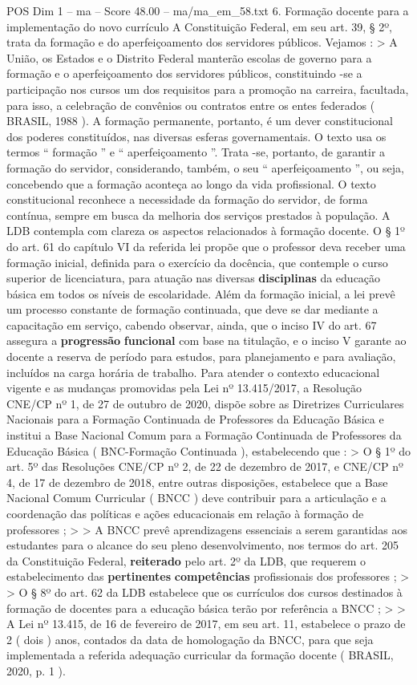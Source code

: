 \begin{textsample}{POS Dim 1 – ma – Score 48.00 – ma/ma\_em\_58.txt}  \label{ex:f1_pos_070}
6.
Formação docente para a implementação do novo currículo A Constituição Federal, em seu art. 39, § 2º, trata da formação e do aperfeiçoamento dos servidores públicos.
Vejamos : > A União, os Estados e o Distrito Federal manterão escolas de governo para a formação e o aperfeiçoamento dos servidores públicos, constituindo -se a participação nos cursos um dos requisitos para a promoção na carreira, facultada, para isso, a celebração de convênios ou contratos entre os entes federados ( BRASIL, 1988 ).
A formação permanente, portanto, é um dever constitucional dos poderes constituídos, nas diversas esferas governamentais.
O texto usa os termos “ formação ” e “ aperfeiçoamento ”.
Trata -se, portanto, de garantir a formação do servidor, considerando, também, o seu “ aperfeiçoamento ”, ou seja, concebendo que a formação aconteça ao longo da vida profissional.
O texto constitucional reconhece a necessidade da formação do servidor, de forma contínua, sempre em busca da melhoria dos serviços prestados à população.
A LDB contempla com clareza os aspectos relacionados à formação docente.
O § 1º do art. 61 do capítulo VI da referida lei propõe que o professor deva receber uma formação inicial, definida para o exercício da docência, que contemple o curso superior de licenciatura, para atuação nas diversas \textbf{disciplinas} da educação básica em todos os níveis de escolaridade.
Além da formação inicial, a lei prevê um processo constante de formação continuada, que deve se dar mediante a capacitação em serviço, cabendo observar, ainda, que o inciso IV do art. 67 assegura a \textbf{progressão} \textbf{funcional} com base na titulação, e o inciso V garante ao docente a reserva de período para estudos, para planejamento e para avaliação, incluídos na carga horária de trabalho.
Para atender o contexto educacional vigente e as mudanças promovidas pela Lei nº 13.415/2017, a Resolução CNE/CP nº 1, de 27 de outubro de 2020, dispõe sobre as Diretrizes Curriculares Nacionais para a Formação Continuada de Professores da Educação Básica e institui a Base Nacional Comum para a Formação Continuada de Professores da Educação Básica ( BNC-Formação Continuada ), estabelecendo que : > O § 1º do art. 5º das Resoluções CNE/CP nº 2, de 22 de dezembro de 2017, e CNE/CP nº 4, de 17 de dezembro de 2018, entre outras disposições, estabelece que a Base Nacional Comum Curricular ( BNCC ) deve contribuir para a articulação e a coordenação das políticas e ações educacionais em relação à formação de professores ; > > A BNCC prevê aprendizagens essenciais a serem garantidas aos estudantes para o alcance do seu pleno desenvolvimento, nos termos do art. 205 da Constituição Federal, \textbf{reiterado} pelo art. 2º da LDB, que requerem o estabelecimento das \textbf{pertinentes} \textbf{competências} profissionais dos professores ; > > O § 8º do art. 62 da LDB estabelece que os currículos dos cursos destinados à formação de docentes para a educação básica terão por referência a BNCC ; > > A Lei nº 13.415, de 16 de fevereiro de 2017, em seu art. 11, estabelece o prazo de 2 ( dois ) anos, contados da data de homologação da BNCC, para que seja implementada a referida adequação curricular da formação docente ( BRASIL, 2020, p. 1 ).

\end{textsample}
